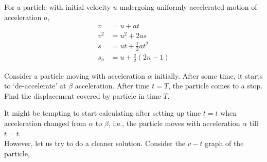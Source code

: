 
\begin{theorem}
    For a particle with initial velocity \(u\) undergoing uniformly accelerated motion of acceleration \(a\),
    \begin{align}
        v &= u + at \\
        v^2 &= u^2 + 2as \\
        s &= ut + \frac{1}{2} at^2 \\
        s_{n} &= u + \frac{a}{2}(2n - 1)
    \end{align}
\end{theorem}



\begin{example}
    Consider a particle moving with acceleration \(\alpha\) initially. After some time, it starts
    to `de-accelerate' at \(\beta\) acceleration. After time \(t = T\), the particle comes to a stop.
    Find the displacement covered by particle in time \(T\).
\begin{soln}
        It might be tempting to start calculating after setting up time \(t = t\) when acceleration
        changed from \(\alpha\) to \(\beta\), i.e., the particle moves with acceleration \(\alpha\) till
        \(t = t\).\\
        However, let us try to do a cleaner solution. Consider the \(v-t\) graph of the particle,

        \begin{figure}
            [H]
            \centering
        \end{figure}
\end{soln}
\end{example}